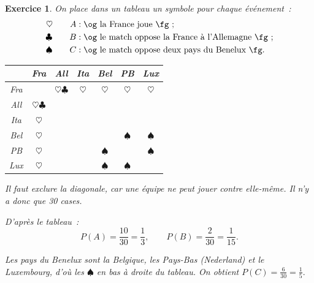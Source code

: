 \documentclass[10pt]{article}
\newtheorem{exo}{Exercice}
\begin{document}
\begin{exo}


On place dans un tableau un symbole pour chaque événement~:
\begin{align*}
\heartsuit\qquad A &: \text{\og la France joue \fg}~;\\
\clubsuit\qquad B &: \text{\og le match oppose la France à l’Allemagne \fg}~;\\
\spadesuit\qquad C &: \text{\og le match oppose deux pays du Benelux \fg}.
\end{align*}

\begin{center}
\begin{tabular}{|c|c|c|c|c|c|c|}\hline
~&Fra&All&Ita&Bel&PB&Lux \\ \hline
Fra&\cellcolor{black}&$\heartsuit\clubsuit$&$\heartsuit$&$\heartsuit$&$\heartsuit$&$\heartsuit$	\\ \hline
All&$\heartsuit\clubsuit$&\cellcolor{black}&&&&\\ \hline
Ita&$\heartsuit$&&\cellcolor{black}&&&\\ \hline
Bel&$\heartsuit$&&&\cellcolor{black}&$\spadesuit$&$\spadesuit$\\ \hline
PB&$\heartsuit$&&&$\spadesuit$&\cellcolor{black}&$\spadesuit$\\ \hline
Lux&$\heartsuit$&&&$\spadesuit$&$\spadesuit$&\cellcolor{black}\\ \hline
\end{tabular}
\end{center}

\danger Il faut exclure la diagonale, car une équipe ne peut jouer contre elle-même. Il n'y a donc que 30 cases.

\medskip

D'après le tableau~: \[P(A)=\frac{10}{30}=\frac{1}{3},\qquad P(B)=\frac{2}{30}=\frac{1}{15}.\]

\medskip

Les pays du Benelux sont la Belgique, les Pays-Bas (Nederland) et le Luxembourg, d'où les $\spadesuit$ en bas à droite du tableau. On obtient $P(C)=\frac{6}{30}=\frac{1}{5}.$

\end{exo}
\end{document}
